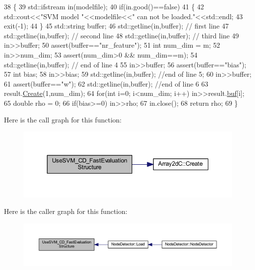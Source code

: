 \begin{DoxyCode}
38 \{
39     std::ifstream in(modelfile);
40     \textcolor{keywordflow}{if}(in.good()==\textcolor{keyword}{false})
41     \{
42         std::cout<<\textcolor{stringliteral}{"SVM model "}<<modelfile<<\textcolor{stringliteral}{" can not be loaded."}<<std::endl;
43         exit(-1);
44     \}
45     std::string buffer;
46     std::getline(in,buffer); \textcolor{comment}{// first line}
47     std::getline(in,buffer); \textcolor{comment}{// second line}
48     std::getline(in,buffer); \textcolor{comment}{// third line}
49     in>>buffer;
50     assert(buffer==\textcolor{stringliteral}{"nr\_feature"});
51     \textcolor{keywordtype}{int} num\_dim = m;
52     in>>num\_dim;
53     assert(num\_dim>0 && num\_dim==m);
54     std::getline(in,buffer); \textcolor{comment}{// end of line 4}
55     in>>buffer;
56     assert(buffer==\textcolor{stringliteral}{"bias"});
57     \textcolor{keywordtype}{int} bias;
58     in>>bias;
59     std::getline(in,buffer); \textcolor{comment}{//end of line 5;}
60     in>>buffer;
61     assert(buffer==\textcolor{stringliteral}{"w"});
62     std::getline(in,buffer); \textcolor{comment}{//end of line 6}
63     result.\mbox{\hyperlink{class_array2d_c_abfe87be7641dfc586b9e7bffebcca9ec}{Create}}(1,num\_dim);
64     \textcolor{keywordflow}{for}(\textcolor{keywordtype}{int} i=0; i<num\_dim; i++) in>>result.\mbox{\hyperlink{class_array2d_c_a25d8fa5049d4c7ded126e0acdd18f37a}{buf}}[i];
65     \textcolor{keywordtype}{double} rho = 0;
66     \textcolor{keywordflow}{if}(bias>=0) in>>rho;
67     in.close();
68     \textcolor{keywordflow}{return} rho;
69 \}
\end{DoxyCode}
Here is the call graph for this function\+:\nopagebreak
\begin{figure}[H]
\begin{center}
\leavevmode
\includegraphics[width=350pt]{c4-pedestrian-detector_8cpp_a1a25c5eeb6b4917c272b201ff023ba68_cgraph}
\end{center}
\end{figure}
Here is the caller graph for this function\+:\nopagebreak
\begin{figure}[H]
\begin{center}
\leavevmode
\includegraphics[width=350pt]{c4-pedestrian-detector_8cpp_a1a25c5eeb6b4917c272b201ff023ba68_icgraph}
\end{center}
\end{figure}
